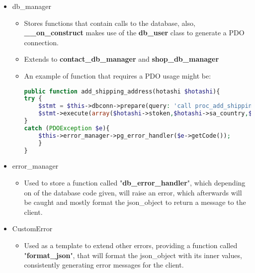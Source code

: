 \begin{flushleft}
\begin{itemize}
        \item db\_manager
        \begin{itemize}
            \item Stores functions that contain calls to the database, also, \textbf{\_\_on\_construct} makes use of the \textbf{db\_user}  class to generate a PDO connection.
            \item Extends to \textbf{contact\_db\_manager} and \textbf{shop\_db\_manager}
            \item \begin{flushleft}
                An example of function that requires a PDO usage might be:
                \begin{lstlisting}[language=php,label={lst:php_pdo_query_example}]
public function add_shipping_address(hotashi $hotashi){
try {
    $stmt = $this->dbconn->prepare(query: 'call proc_add_shipping_address_from_stoken(?,?,?,?,?,?,?);');
    $stmt->execute(array($hotashi->stoken,$hotashi->sa_country,$hotashi->sa_city,$hotashi->sa_pcode,$hotashi->sa_add1,$hotashi->sa_add2,$hotashi->sa_add3));
}
catch (PDOException $e){
    $this->error_manager->pg_error_handler($e->getCode());
    }
}
                \end{lstlisting}
            \end{flushleft}
        \end{itemize}
    \end{itemize}
    \begin{itemize}
        \item error\_manager
        \begin{itemize}
            \item Used to store a function called "\textbf{db\_error\_handler}", which depending on of the database
            code given, will raise an error, which afterwards will be caught and mostly format the json\_object to
            return a message to the client.
        \end{itemize}
    \end{itemize}
    \begin{itemize}
        \item CustomError
        \begin{itemize}
            \item Used as a template to extend other errors, providing a function called "\textbf{format\_json}", that
            will format the json\_object with its inner values, consistently generating error messages for the client.
        \end{itemize}

\end{itemize}
\end{flushleft}
